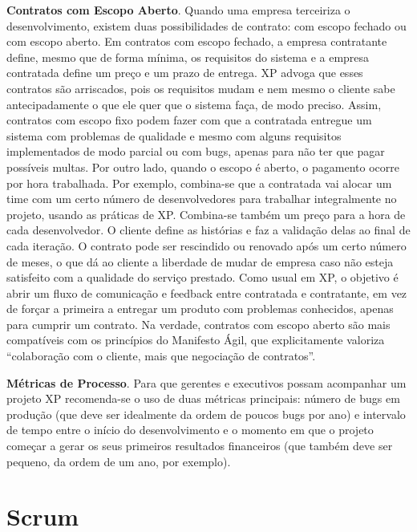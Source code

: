 \documentclass[
  11pt,
  twoside]{book}
\begin{document}
\textbf{Contratos com Escopo Aberto}. Quando uma empresa terceiriza o
desenvolvimento, existem duas possibilidades de contrato: com escopo
fechado ou com escopo aberto. Em contratos com escopo fechado, a empresa
contratante define, mesmo que de forma mínima, os requisitos do sistema
e a empresa contratada define um preço e um prazo de entrega. XP advoga
que esses contratos são arriscados, pois os requisitos mudam e nem mesmo
o cliente sabe antecipadamente o que ele quer que o sistema faça, de
modo preciso. Assim, contratos com escopo fixo podem fazer com que a
contratada entregue um sistema com problemas de qualidade e mesmo com
alguns requisitos implementados de modo parcial ou com bugs, apenas para
não ter que pagar possíveis multas. Por outro lado, quando o escopo é
aberto, o pagamento ocorre por hora trabalhada. Por exemplo, combina-se
que a contratada vai alocar um time com um certo número de
desenvolvedores para trabalhar integralmente no projeto, usando as
práticas de XP. Combina-se também um preço para a hora de cada
desenvolvedor. O cliente define as histórias e faz a validação delas ao
final de cada iteração. O contrato pode ser rescindido ou renovado após
um certo número de meses, o que dá ao cliente a liberdade de mudar de
empresa caso não esteja satisfeito com a qualidade do serviço prestado.
Como usual em XP, o objetivo é abrir um fluxo de comunicação e feedback
entre contratada e contratante, em vez de forçar a primeira a entregar
um produto com problemas conhecidos, apenas para cumprir um contrato. Na
verdade, contratos com escopo aberto são mais compatíveis com os
princípios do Manifesto Ágil, que explicitamente valoriza ``colaboração
com o cliente, mais que negociação de contratos''.

 \textbf{Métricas de
Processo}. Para que gerentes e executivos possam acompanhar um projeto
XP recomenda-se o uso de duas métricas principais: número de bugs em
produção (que deve ser idealmente da ordem de poucos bugs por ano) e
intervalo de tempo entre o início do desenvolvimento e o momento em que
o projeto começar a gerar os seus primeiros resultados financeiros (que
também deve ser pequeno, da ordem de um ano, por exemplo).

\hypertarget{scrum}{%
\section{Scrum}\label{scrum}}
\end{document}
